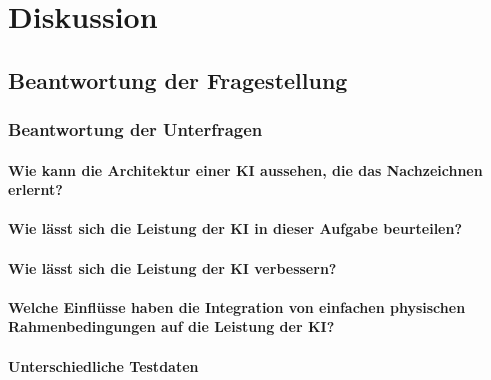 \chapter{Diskussion}

\section{Beantwortung der Fragestellung}


\subsection{Beantwortung der Unterfragen}

\subsubsection*{Wie kann die Architektur einer KI aussehen, die das Nachzeichnen erlernt?}

\subsubsection*{Wie lässt sich die Leistung der KI in dieser Aufgabe beurteilen?}

\subsubsection*{Wie lässt sich die Leistung der KI verbessern?}

\subsubsection*{Welche Einflüsse haben die Integration von einfachen physischen Rahmenbedingungen auf die Leistung der KI?}

\subsubsection*{Unterschiedliche Testdaten}

